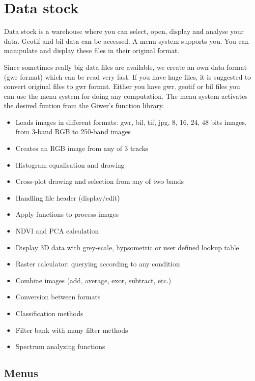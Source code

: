 \documentclass[a4paper,12pt]{article}
\begin{document}
\section{Data stock}

Data stock is a warehouse where you can select, open, display and analyse your data.  Geotif and bil data can be accessed.  A menu system supports you.   You  can  manipulate  and  display  these  files  in  their  original  format.

Since sometimes really big data files are available, we create an own data format (gwr format) which can be read very fast.  If you have huge files, it is suggested to convert original files to gwr format. Either you have gwr, geotif or bil  files you can use the menu system for doing any computation. The menu system activates the desired funtion from the Giwer’s function library.

\begin{itemize}	
\item Loads images in different formats: gwr, bil, tif, jpg, 8, 16, 24, 48 bits images, from 3-band RGB to 250-band images 
\item Creates an RGB image from any of 3 tracks 
\item Histogram equalisation and drawing 
\item Cross-plot drawing and selection from any of two bands
\item Handling file header (display/edit)
\item Apply functions to process images 
\item NDVI and PCA calculation 
\item Display 3D data with grey-scale, hypsometric or user defined lookup table
\item Raster calculator: querying according to any condition  
\item Combine images (add, average, exor, subtract, etc.)
\item Conversion between formats 
\item Classification methods 
\item Filter bank with many filter methods
\item Spectrum analyzing functions
\end{itemize}



\subsection{Menus}
\end{document}
